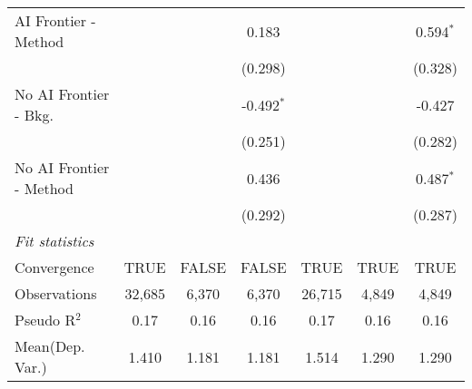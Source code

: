 \begin{tabular}{lcccccc}
   AI Frontier - Method    &               &              & 0.183         &               &               & 0.594$^{*}$\\   
                           &               &              & (0.298)       &               &               & (0.328)\\   
   No AI Frontier - Bkg.   &               &              & -0.492$^{*}$  &               &               & -0.427\\   
                           &               &              & (0.251)       &               &               & (0.282)\\   
   No AI Frontier - Method &               &              & 0.436         &               &               & 0.487$^{*}$\\   
                           &               &              & (0.292)       &               &               & (0.287)\\   
   \midrule
   \emph{Fit statistics}\\
   Convergence             &TRUE           & FALSE        & FALSE         & TRUE          & TRUE          & TRUE\\  
   Observations            & 32,685        & 6,370        & 6,370         & 26,715        & 4,849         & 4,849\\  
   Pseudo R$^2$            & 0.17          & 0.16         & 0.16          & 0.17          & 0.16          & 0.16\\  
Mean(Dep. Var.) & 1.410 & 1.181 & 1.181 & 1.514 & 1.290 & 1.290 \\
   

\end{tabular}
